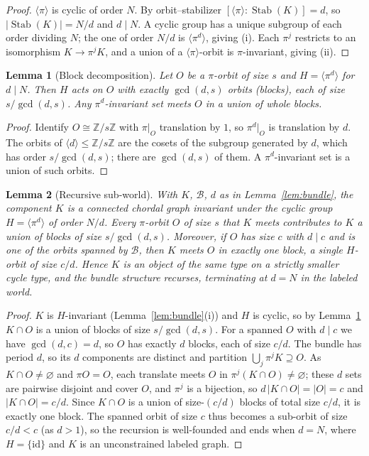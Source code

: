\documentclass[11pt]{article}
\theoremstyle{plain}
\newtheorem{lemma}{Lemma}
\theoremstyle{definition}
\DeclareMathOperator{\Stab}{Stab}
\newcommand{\Z}{\mathbb{Z}}
\newcommand{\orb}{\mathcal{B}}
\begin{document}
\begin{proof}
$\langle\pi\rangle$ is cyclic of order $N$. By orbit--stabilizer $[\langle\pi\rangle:\Stab(K)]=d$,
so $|\Stab(K)|=N/d$ and $d\mid N$. A cyclic group has a unique subgroup of each order dividing $N$;
the one of order $N/d$ is $\langle\pi^d\rangle$, giving (i). Each $\pi^j$ restricts to an isomorphism
$K\to\pi^jK$, and a union of a $\langle\pi\rangle$-orbit is $\pi$-invariant, giving (ii).
\end{proof}

\begin{lemma}[Block decomposition]\label{lem:block}
Let $O$ be a $\pi$-orbit of size $s$ and $H=\langle\pi^d\rangle$ for $d\mid N$. Then $H$ acts on $O$
with exactly $\gcd(d,s)$ orbits (\emph{blocks}), each of size $s/\gcd(d,s)$. Any
$\pi^{d}$-invariant set meets $O$ in a union of whole blocks.
\end{lemma}

\begin{proof}
Identify $O\cong\Z/s\Z$ with $\pi|_O$ translation by $1$, so $\pi^{d}|_O$ is translation by $d$. The
orbits of $\langle d\rangle\le\Z/s\Z$ are the cosets of the subgroup generated by $d$, which has
order $s/\gcd(d,s)$; there are $\gcd(d,s)$ of them. A $\pi^d$-invariant set is a union of such
orbits.
\end{proof}

\begin{lemma}[Recursive sub-world]\label{lem:sub}
With $K$, $\orb$, $d$ as in Lemma~\ref{lem:bundle}, the component $K$ is a connected chordal graph
invariant under the cyclic group $H=\langle\pi^{d}\rangle$ of order $N/d$. Every $\pi$-orbit $O$ of
size $s$ that $K$ meets contributes to $K$ a union of blocks of size $s/\gcd(d,s)$. Moreover, if $O$
has size $c$ with $d\mid c$ and is one of the orbits spanned by $\orb$, then $K$ meets $O$ in exactly
one block, a single $H$-orbit of size $c/d$. Hence $K$ is an object of the same type on a strictly
smaller cycle type, and the bundle structure recurses, terminating at $d=N$ in the labeled world.
\end{lemma}

\begin{proof}
$K$ is $H$-invariant (Lemma~\ref{lem:bundle}(i)) and $H$ is cyclic, so by Lemma~\ref{lem:block} $K\cap
O$ is a union of blocks of size $s/\gcd(d,s)$. For a spanned $O$ with $d\mid c$ we have
$\gcd(d,c)=d$, so $O$ has exactly $d$ blocks, each of size $c/d$. The bundle has period $d$, so its
$d$ components are distinct and partition $\bigcup_j\pi^jK\supseteq O$. As $K\cap O\ne\varnothing$ and
$\pi O=O$, each translate meets $O$ in $\pi^j(K\cap O)\ne\varnothing$; these $d$ sets are pairwise
disjoint and cover $O$, and $\pi^j$ is a bijection, so $d\,|K\cap O|=|O|=c$ and $|K\cap O|=c/d$. Since
$K\cap O$ is a union of size-$(c/d)$ blocks of total size $c/d$, it is exactly one block. The spanned
orbit of size $c$ thus becomes a sub-orbit of size $c/d<c$ (as $d>1$), so the recursion is
well-founded and ends when $d=N$, where $H=\{\mathrm{id}\}$ and $K$ is an unconstrained labeled graph.
\end{proof}
\end{document}
